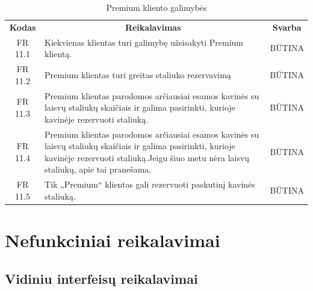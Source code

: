 \documentclass{VUMIFPSkursinis}
\begin{document}
\begin{center}
	\begin{table}[H]
	\caption{Premium kliento galimybės}
	\begin{tabular}{|p{2cm}|p{}|p{}|}
	\hline
	    \rowcolor{lightgray}
		\multicolumn{3}{|c|}{Premium kliento galimybės}\\
		
	\hline
		\multicolumn{1}{|c|}{{\bfseries Kodas}}&
		\multicolumn{1}{|c|}{{\bfseries Reikalavimas}}&
		\multicolumn{1}{|c|}{{\bfseries Svarba}}\\
	\hline 	
		\multicolumn{1}{|c|}{FR 11.1}&
		{Kiekvienas klientas turi galimybę užsisakyti Premium klientą.}&
		\multicolumn{1}{|c|}{BŪTINA}\\
				
	\hline 	
		\multicolumn{1}{|c|}{FR 11.2}&
		{Premium klientas turi greitas staliuko rezervavimą}&
		\multicolumn{1}{|c|}{BŪTINA}\\
				
	\hline 	
		\multicolumn{1}{|c|}{FR 11.3}&
		{Premium klientas parodomos arčiausiai esamos kavinės su laisvų staliukų skaičiais ir galima pasirinkti, kurioje kavinėje rezervuoti staliuką.}&
		\multicolumn{1}{|c|}{BŪTINA}\\
				
	\hline 	
		\multicolumn{1}{|c|}{FR 11.4}&
		{Premium klientas parodomos arčiausiai esamos kavinės su laisvų staliukų skaičiais ir galima pasirinkti, kurioje kavinėje rezervuoti staliuką.Jeigu šiuo metu nėra laisvų staliukų, apie tai pranešama.}&
		\multicolumn{1}{|c|}{BŪTINA}\\
				
	\hline 	
		\multicolumn{1}{|c|}{FR 11.5}&
		{Tik „Premium“ klientas gali rezervuoti paskutinį kavinės staliuką.}&
		\multicolumn{1}{|c|}{BŪTINA}\\
				
	\hline

	\end{tabular}
	
	\label{table:Premiumklientogalimybės}		
	\end{table}

\end{center}

\pagebreak
\section{Nefunkciniai reikalavimai}

\subsection{Vidiniu interfeisų reikalavimai}
\end{document}
